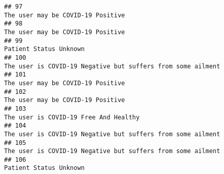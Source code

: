\documentclass[
]{article}
\begin{document}
\begin{verbatim}
## 97                                                                                                                                                                                                                                   The user may be COVID-19 Positive
## 98                                                                                                                                                                                                                                   The user may be COVID-19 Positive
## 99                                                                                                                                                                                                                                              Patient Status Unknown
## 100                                                                                                                                                                                                        The user is COVID-19 Negative but suffers from some ailment
## 101                                                                                                                                                                                                                                  The user may be COVID-19 Positive
## 102                                                                                                                                                                                                                                  The user may be COVID-19 Positive
## 103                                                                                                                                                                                                                              The user is COVID-19 Free And Healthy
## 104                                                                                                                                                                                                        The user is COVID-19 Negative but suffers from some ailment
## 105                                                                                                                                                                                                        The user is COVID-19 Negative but suffers from some ailment
## 106                                                                                                                                                                                                                                             Patient Status Unknown

\end{verbatim}
\end{document}
